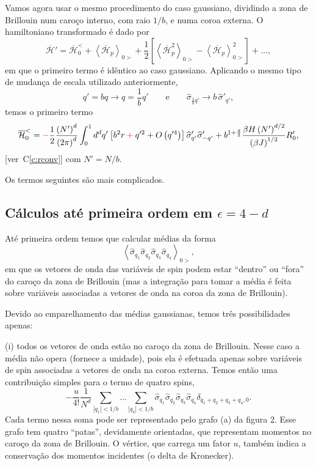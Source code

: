\documentclass[12pt,a4paper]{article}
\newcommand{\Hb}{\overline{\mathcal{H}}}
\newcommand{\sh}{\widehat{\sigma}}
\newcommand{\corr}[1]{\textcolor{red}{#1}}
\newcommand{\cmais}{\mathbin{\textcolor{red}{+}}}
\newcounter{corr}
\newcommand{\ver}[1]{{\color{red}\small[ver~C\ref{#1}]}}
\begin{document}
Vamos agora usar o mesmo procedimento do caso gaussiano, dividindo a
zona de Brillouin num caroço interno, com raio $1/b$, e numa coroa externa.
O hamiltoniano transformado é dado por
\begin{equation}
\Hb'=\Hb_0^{<}+\left\langle\Hb_p\right\rangle_{0>}+\frac12\left[\left\langle\Hb_p^2\right\rangle_{0>}-\left\langle\Hb_p\right\rangle_{0>}^2\right]+...,
\end{equation}
em que o primeiro termo é idêntico ao caso gaussiano. Aplicando o mesmo
tipo de mudança de escala utilizado anteriormente,
\begin{equation}
q'=bq\to q=\frac1bq'\qquad\text{e}\qquad\sh_{\frac1bq'}\to b\,\sh'_{q'},
\end{equation}
temos o primeiro termo
\begin{equation}
\Hb_0^{<}=\corr{-}\frac12\frac{\left(N'\right)^d}{\left(2\pi\right)^d}\int_0^1d^dq'\left[b^2r\cmais q'^2+O\left(q'^4\right)\right]\sh'_{q'}\sh'_{-q'}
+b^{1+\frac d2}\frac{\beta H\left(N'\right)^{d/2}}{\left(\beta J\right)^{1/2}}R'_0,
\end{equation}
\ver{c:rconv}
com $N'=N/b$.

Os termos seguintes são mais complicados.

\subsection{Cálculos até primeira ordem em $\epsilon=4-d$}

Até primeira ordem temos que calcular médias da forma
\begin{equation}
\left\langle\sh_{q_1}\sh_{q_2}\sh_{q_3}\sh_{q_4}\right\rangle_{0>},
\end{equation}
em que os vetores de onda das variáveis de spin podem estar ``dentro'' ou
``fora'' do caroço da zona de Brillouin (mas a integração para tomar a média
é feita sobre variáveis associadas a vetores de onda na coroa da zona de
Brillouin).

Devido ao emparelhamento das médias gaussianas, temos três
possibilidades apenas:

(i) todos os vetores de onda estão no caroço da zona de Brillouin. Nesse
caso a média não opera (fornece a unidade), pois ela é efetuada apenas sobre
variáveis de spin associadas a vetores de onda na coroa externa. Temos então
uma contribuição simples para o termo de quatro spins,
\begin{equation}
-\frac{u}{4!}\frac{1}{N^d}\sum_{|q_1|<1/b}...\sum_{|q_4|<1/b}\sh_{q_1}\sh_{q_2}\sh_{q_3}\sh_{q_4}\delta_{q_1+q_2+q_3+q_4,0}.
\end{equation}
Cada termo nessa soma pode ser representado pelo grafo (a) da figura 2.
Esse grafo tem quatro ``patas'', devidamente orientadas, que representam
momentos no caroço da zona de Brillouin. O vértice, que carrega um
fator $u$, também indica a conservação dos momentos incidentes (o delta de
Kronecker).
\end{document}
